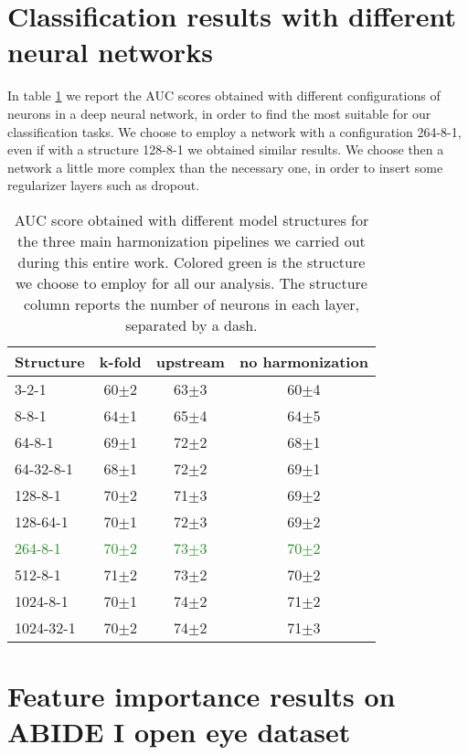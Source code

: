 \documentclass[11pt]{report}
\begin{document}
\section{Classification results with different neural networks}

In table \ref{tab:different_model_structures} we report the AUC scores obtained with different configurations of neurons in a deep neural network, in order to find the most suitable for our classification tasks. 
We choose to employ a network with a configuration 264-8-1, even if with a structure 128-8-1 we obtained similar results.
We choose then a network a little more complex than the necessary one, in order to insert some regularizer layers such as dropout.
\begin{table}[!htp]\centering
\begin{tabular}{lccc}
\toprule
Structure &k-fold &upstream &no harmonization \\
\midrule
3-2-1 &60$\pm$2 &63$\pm$3 &60$\pm$4 \\
8-8-1 &64$\pm$1 &65$\pm$4 &64$\pm$5 \\
64-8-1 &69$\pm$1 &72$\pm$2 &68$\pm$1 \\
64-32-8-1 &68$\pm$1 &72$\pm$2 &69$\pm$1 \\
128-8-1 &70$\pm$2 &71$\pm$3 &69$\pm$2 \\
128-64-1 &70$\pm$1 &72$\pm$3 &69$\pm$2 \\
\textcolor{ForestGreen}{264-8-1}&\textcolor{ForestGreen}{70$\pm$2} & \textcolor{ForestGreen}{73$\pm$3} & \textcolor{ForestGreen}{70$\pm$2} \\
512-8-1 &71$\pm$2 &73$\pm$2 &70$\pm$2 \\
1024-8-1 &70$\pm$1 &74$\pm$2 &71$\pm$2 \\
1024-32-1 &70$\pm$2 &74$\pm$2 &71$\pm$3 \\
\bottomrule
\end{tabular}
\caption{AUC score obtained with different model structures for the three main harmonization pipelines we carried out during this entire work. Colored green is the structure we choose to employ for all our analysis.
The structure column reports the number of neurons in each layer, separated by a dash.
}
\label{tab:different_model_structures}
\end{table}

\section{Feature importance results on ABIDE I open eye dataset}
\end{document}
